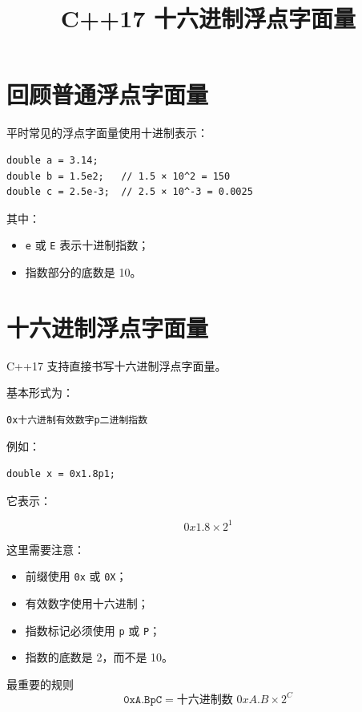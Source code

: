\documentclass[UTF8,12pt,a4paper]{ctexart}
\title{\textbf{C++17 十六进制浮点字面量}}
\author{}
\date{}
\begin{document}
\maketitle

\section{回顾普通浮点字面量}

平时常见的浮点字面量使用十进制表示：

\begin{lstlisting}
double a = 3.14;
double b = 1.5e2;   // 1.5 × 10^2 = 150
double c = 2.5e-3;  // 2.5 × 10^-3 = 0.0025
\end{lstlisting}

其中：

\begin{itemize}
    \item \texttt{e} 或 \texttt{E} 表示十进制指数；
    \item 指数部分的底数是 10。
\end{itemize}

\section{十六进制浮点字面量}

C++17 支持直接书写十六进制浮点字面量。

基本形式为：

\begin{lstlisting}
0x十六进制有效数字p二进制指数
\end{lstlisting}

例如：

\begin{lstlisting}
double x = 0x1.8p1;
\end{lstlisting}

它表示：

\[
0x1.8 \times 2^1
\]

这里需要注意：

\begin{itemize}
    \item 前缀使用 \texttt{0x} 或 \texttt{0X}；
    \item 有效数字使用十六进制；
    \item 指数标记必须使用 \texttt{p} 或 \texttt{P}；
    \item 指数的底数是 2，而不是 10。
\end{itemize}

\begin{conceptbox}{最重要的规则}
\[
\texttt{0xA.BpC}
=
\text{十六进制数 }0xA.B
\times 2^C
\]
\end{conceptbox}
\end{document}
